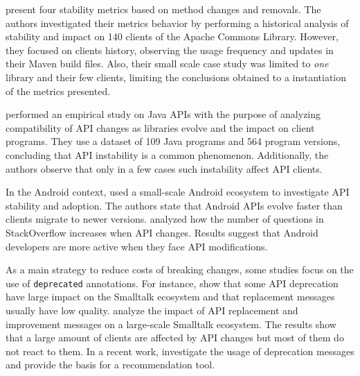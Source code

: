 \documentclass[11pt, a4paper]{article}
\begin{document}
\cite{van12} present four stability metrics based on method changes and removals. 
The authors investigated their metrics behavior by performing a historical analysis of stability and impact on 140 clients of the Apache Commons Library.
However, they focused on clients history, observing the usage frequency and updates in their Maven build files.
Also, their small scale case study was limited to \emph{one} library and their few clients, limiting the conclusions obtained to a instantiation of the metrics presented.

\cite{jezek15} performed an empirical study on Java APIs with the purpose of analyzing compatibility of API changes as libraries evolve and the impact on client programs.
They use a dataset of 109 Java programs and 564 program versions, concluding that API instability is a common phenomenon. 
Additionally, the authors observe that only in a few cases such instability affect API clients.

In the Android context, \cite{McDo13} used a small-scale Android ecosystem to investigate API stability and adoption.
The authors state that Android APIs evolve faster than clients migrate to newer versions.
\cite{linares14} analyzed how the number of questions in StackOverflow increases when API changes.
Results suggest that Android developers are more active when they face API modifications.


As a main strategy to reduce costs of breaking changes, some studies focus on the use of {\tt deprecated} annotations.
For instance, \cite{Robb12} show that some API deprecation have large impact on the Smalltalk ecosystem and that replacement messages usually have low quality.
\cite{Hora15a} analyze the impact of API replacement and improvement messages on a large-scale Smalltalk ecosystem.
The results show that a large amount of clients are affected by API changes but most of them do not react to them. 
In a recent work, \cite{Brito16} investigate the usage of deprecation messages and provide the basis for a recommendation tool.
\end{document}
